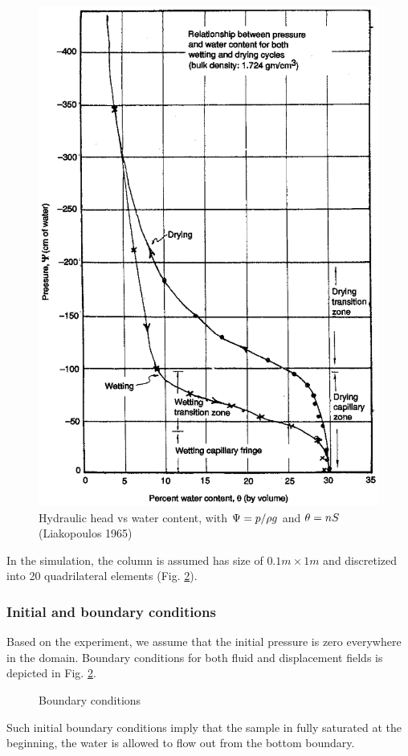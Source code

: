 \begin{figure}[htb!]
\begin{center}
\footnotesize
\includegraphics[width=0.5\columnwidth]{HM/HM_unsat/liakop2.eps}  %
\caption{Hydraulic head vs water content,
with
$\Psi = p/\rho g$
and
$\theta = nS$
(Liakopoulos 1965)
}
\label{fig:liakop2}
\end{center}
\end{figure}
%

In the simulation, the column is assumed has size of $0.1m\times1m$ and discretized into 20 quadrilateral elements (Fig. \ref{fig:modelia}).

\subsubsection*{Initial and boundary conditions}
Based on the experiment, we assume that the initial pressure is zero everywhere in the domain.
Boundary conditions for both fluid and displacement fields is depicted in Fig. \ref{fig:modelia}.
\begin{figure}[!htb]
\begin{center}
\footnotesize

\caption{Boundary conditions}
\label{fig:modelia}
\end{center}
\end{figure}
%
Such initial boundary conditions imply that the sample in fully saturated at the beginning, the water is allowed to
flow out from the bottom boundary.

